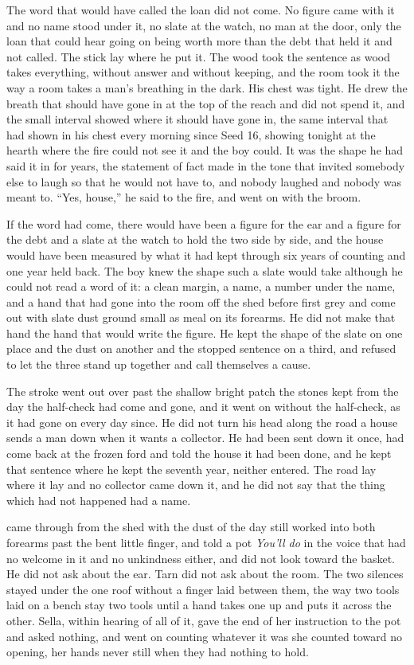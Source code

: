 The word that would have called the loan did not come. No figure came with it and no name stood under it, no slate at the watch, no man at the door, only the loan that could hear going on being worth more than the debt that held it and not called. The stick lay where he put it. The wood took the sentence as wood takes everything, without answer and without keeping, and the room took it the way a room takes a man's breathing in the dark. His chest was tight. He drew the breath that should have gone in at the top of the reach and did not spend it, and the small interval showed where it should have gone in, the same interval that had shown in his chest every morning since Seed 16, showing tonight at the hearth where the fire could not see it and the boy could. It was the shape he had said it in for years, the statement of fact made in the tone that invited somebody else to laugh so that he would not have to, and nobody laughed and nobody was meant to. “Yes, house,” he said to the fire, and went on with the broom.

If the word had come, there would have been a figure for the ear and a figure for the debt and a slate at the watch to hold the two side by side, and the house would have been measured by what it had kept through six years of counting and one year held back. The boy knew the shape such a slate would take although he could not read a word of it: a clean margin, a name, a number under the name, and a hand that had gone into the room off the shed before first grey and come out with slate dust ground small as meal on its forearms. He did not make that hand the hand that would write the figure. He kept the shape of the slate on one place and the dust on another and the stopped sentence on a third, and refused to let the three stand up together and call themselves a cause.

The stroke went out over  past the shallow bright patch the stones kept from the day the half-check had come and gone, and it went on without the half-check, as it had gone on every day since. He did not turn his head along the road a house sends a man down when it wants a collector. He had been sent down it once, had come back at the frozen ford and told the house it had been done, and he kept that sentence where he kept the seventh year, neither entered. The road lay where it lay and no collector came down it, and he did not say that the thing which had not happened had a name.

 came through from the shed with the dust of the day still worked into both forearms past the bent little finger, and told a pot \emph{You'll do} in the voice that had no welcome in it and no unkindness either, and did not look toward the basket. He did not ask about the ear. Tarn did not ask about the room. The two silences stayed under the one roof without a finger laid between them, the way two tools laid on a bench stay two tools until a hand takes one up and puts it across the other. Sella, within hearing of all of it, gave the end of her instruction to the pot and asked nothing, and went on counting whatever it was she counted toward no opening, her hands never still when they had nothing to hold.

